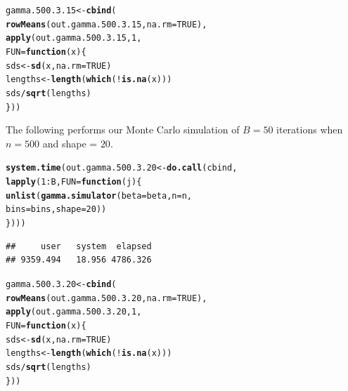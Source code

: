 \documentclass[11pt]{article}\usepackage[]{graphicx}\usepackage[]{color}
\makeatletter
\newcommand{\hlnum}[1]{\textcolor[rgb]{0.686,0.059,0.569}{#1}}%
\newcommand{\hlopt}[1]{\textcolor[rgb]{0,0,0}{#1}}%
\newcommand{\hlstd}[1]{\textcolor[rgb]{0.345,0.345,0.345}{#1}}%
\newcommand{\hlkwa}[1]{\textcolor[rgb]{0.161,0.373,0.58}{\textbf{#1}}}%
\newcommand{\hlkwb}[1]{\textcolor[rgb]{0.69,0.353,0.396}{#1}}%
\newcommand{\hlkwc}[1]{\textcolor[rgb]{0.333,0.667,0.333}{#1}}%
\newcommand{\hlkwd}[1]{\textcolor[rgb]{0.737,0.353,0.396}{\textbf{#1}}}%
\newenvironment{kframe}{%
 \def\at@end@of@kframe{}%
 \ifinner\ifhmode%
  \def\at@end@of@kframe{\end{minipage}}%
  \begin{minipage}{\columnwidth}%
 \fi\fi%
 \def\FrameCommand##1{\hskip\@totalleftmargin \hskip-\fboxsep
 \colorbox{shadecolor}{##1}\hskip-\fboxsep
     \hskip-\linewidth \hskip-\@totalleftmargin \hskip\columnwidth}%
 \MakeFramed {\advance\hsize-\width
   \@totalleftmargin\z@ \linewidth\hsize
   \@setminipage}}%
 {\par\unskip\endMakeFramed%
 \at@end@of@kframe}
\newenvironment{knitrout}{}{} %
\makeatother
\begin{document}
\begin{knitrout}
\color{fgcolor}\begin{kframe}
\begin{alltt}
\hlstd{gamma.500.3.15} \hlkwb{<-} \hlkwd{cbind}\hlstd{(}
  \hlkwd{rowMeans}\hlstd{(out.gamma.500.3.15,} \hlkwc{na.rm} \hlstd{=} \hlnum{TRUE}\hlstd{),}
  \hlkwd{apply}\hlstd{(out.gamma.500.3.15,} \hlnum{1}\hlstd{,}
  \hlkwc{FUN} \hlstd{=} \hlkwa{function}\hlstd{(}\hlkwc{x}\hlstd{)\{}
    \hlstd{sds} \hlkwb{<-} \hlkwd{sd}\hlstd{(x,} \hlkwc{na.rm} \hlstd{=} \hlnum{TRUE}\hlstd{)}
    \hlstd{lengths} \hlkwb{<-} \hlkwd{length}\hlstd{(}\hlkwd{which}\hlstd{(}\hlopt{!}\hlkwd{is.na}\hlstd{(x)))}
    \hlstd{sds} \hlopt{/} \hlkwd{sqrt}\hlstd{(lengths)}
  \hlstd{\}))}
\end{alltt}
\end{kframe}
\end{knitrout}

The following performs our Monte Carlo simulation of $B = 50$ iterations 
when $n = 500$ and shape = $20$.

\begin{knitrout}
\color{fgcolor}\begin{kframe}
\begin{alltt}
\hlkwd{system.time}\hlstd{(out.gamma.500.3.20} \hlkwb{<-} \hlkwd{do.call}\hlstd{(cbind,}
  \hlkwd{lapply}\hlstd{(}\hlnum{1}\hlopt{:}\hlstd{B,} \hlkwc{FUN} \hlstd{=} \hlkwa{function}\hlstd{(}\hlkwc{j}\hlstd{)\{}
    \hlkwd{unlist}\hlstd{(}\hlkwd{gamma.simulator}\hlstd{(}\hlkwc{beta} \hlstd{= beta,} \hlkwc{n} \hlstd{= n,}
      \hlkwc{bins} \hlstd{= bins,} \hlkwc{shape} \hlstd{=} \hlnum{20}\hlstd{))}
\hlstd{\})))}
\end{alltt}
\begin{verbatim}
##     user   system  elapsed 
## 9359.494   18.956 4786.326
\end{verbatim}
\end{kframe}
\end{knitrout}

\begin{knitrout}
\color{fgcolor}\begin{kframe}
\begin{alltt}
\hlstd{gamma.500.3.20} \hlkwb{<-} \hlkwd{cbind}\hlstd{(}
  \hlkwd{rowMeans}\hlstd{(out.gamma.500.3.20,} \hlkwc{na.rm} \hlstd{=} \hlnum{TRUE}\hlstd{),}
  \hlkwd{apply}\hlstd{(out.gamma.500.3.20,} \hlnum{1}\hlstd{,}
  \hlkwc{FUN} \hlstd{=} \hlkwa{function}\hlstd{(}\hlkwc{x}\hlstd{)\{}
    \hlstd{sds} \hlkwb{<-} \hlkwd{sd}\hlstd{(x,} \hlkwc{na.rm} \hlstd{=} \hlnum{TRUE}\hlstd{)}
    \hlstd{lengths} \hlkwb{<-} \hlkwd{length}\hlstd{(}\hlkwd{which}\hlstd{(}\hlopt{!}\hlkwd{is.na}\hlstd{(x)))}
    \hlstd{sds} \hlopt{/} \hlkwd{sqrt}\hlstd{(lengths)}
  \hlstd{\}))}
\end{alltt}
\end{kframe}
\end{knitrout}
\end{document}
